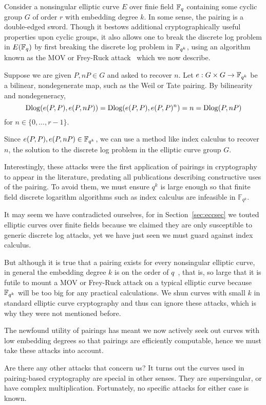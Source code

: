 Consider a nonsingular elliptic curve $E$ over finie field $\mathbb{F}_q$ containing
some cyclic group $G$ of order $r$ with embedding degree $k$.
In some sense, the pairing is a double-edged sword. Though it
bestows additional cryptographically useful properties upon cyclic groups,
it also allows one to break the discrete log problem in $E(\mathbb{F}_q)$
by first breaking the discrete log problem in $\mathbb{F}_{q^k}$,
using an algorithm known as the MOV or Frey-Ruck attack~\cite{mov,fr}
which we now describe.

Suppose we are given $P, nP \in G$ and asked to recover $n$.
Let $e : G \times G \rightarrow \mathbb{F}_{q^k}$ be a bilinear, nondegenerate map,
such as the Weil or Tate pairing.
By bilinearity and nondegeneracy,
\[ \mathop{\rm Dlog} ( e(P,P), e(P, nP) )
= \mathop{\rm Dlog} (e(P,P),e(P,P)^n) = n = \mathop{\rm Dlog}(P,nP) \]
for $n \in \{0,...,r-1\}$.

Since $e(P,P), e(P, nP) \in \mathbb{F}_{q^k}$,
we can use a method like index calculus
to recover $n$, the solution
to the discrete log problem in the elliptic curve group $G$.

Interestingly, these attacks were the first application of pairings
in cryptography to appear in the literature,
predating all publications describing constructive uses of the pairing.
To avoid them, we must ensure $q^k$ is large enough so that
finite field discrete logarithm algorithms such as index calculus are
infeasible in $\mathbb{F}_{q^k}$.

It may seem we have contradicted ourselves, for in Section~\ref{sec:eccsec}
we touted elliptic curves over finite fields because we claimed they
are only susceptible to generic discrete log attacks, yet we have just seen
we must guard against index calculus.

But although it is true that a pairing exists
for every nonsingular elliptic curve, in general
the embedding degree $k$ is on the order of $q$~\cite{bk},
that is, so large that it is futile to mount a MOV or
Frey-Ruck attack on a typical elliptic curve
because $\mathbb{F}_{q^k}$ will be too big for any practical calculations.
We shun curves with small $k$ in standard elliptic curve cryptography
and thus can ignore these attacks, which is why they were not mentioned before.

The newfound utility of pairings has meant 
we now actively seek out curves with low embedding degrees so that pairings
are efficiently computable,
hence we must take these attacks into account.

Are there any other attacks that concern us? It turns out
the curves used in pairing-based cryptography are special in other senses.
They are supersingular, or have complex multiplication.
Fortunately, no specific attacks for either case is known.

